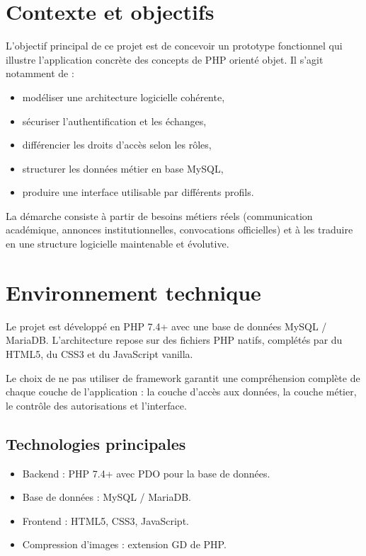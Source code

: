 \documentclass[12pt,a4paper]{article}
\begin{document}
\section{Contexte et objectifs}
L'objectif principal de ce projet est de concevoir un prototype fonctionnel qui illustre l'application concrète des concepts de PHP orienté objet. Il s'agit notamment de :
\begin{itemize}
  \item modéliser une architecture logicielle cohérente,
  \item sécuriser l'authentification et les échanges,
  \item différencier les droits d'accès selon les rôles,
  \item structurer les données métier en base MySQL,
  \item produire une interface utilisable par différents profils.
\end{itemize}

La démarche consiste à partir de besoins métiers réels (communication académique, annonces institutionnelles, convocations officielles) et à les traduire en une structure logicielle maintenable et évolutive.

\section{Environnement technique}
Le projet est développé en PHP 7.4+ avec une base de données MySQL / MariaDB. L'architecture repose sur des fichiers PHP natifs, complétés par du HTML5, du CSS3 et du JavaScript vanilla.

Le choix de ne pas utiliser de framework garantit une compréhension complète de chaque couche de l'application : la couche d'accès aux données, la couche métier, le contrôle des autorisations et l'interface.

\subsection{Technologies principales}
\begin{itemize}
  \item Backend : PHP 7.4+ avec PDO pour la base de données.
  \item Base de données : MySQL / MariaDB.
  \item Frontend : HTML5, CSS3, JavaScript.
  \item Compression d'images : extension GD de PHP.
\end{itemize}
\end{document}
